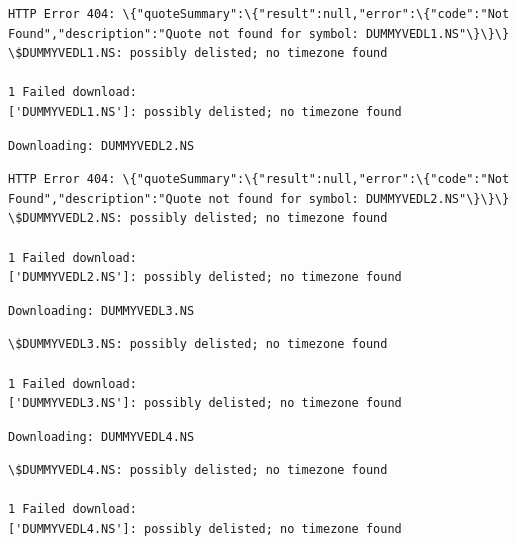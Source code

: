 \documentclass[11pt]{article}
\begin{document}
    \begin{Verbatim}[commandchars=\\\{\}]
HTTP Error 404: \{"quoteSummary":\{"result":null,"error":\{"code":"Not
Found","description":"Quote not found for symbol: DUMMYVEDL1.NS"\}\}\}
\$DUMMYVEDL1.NS: possibly delisted; no timezone found

1 Failed download:
['DUMMYVEDL1.NS']: possibly delisted; no timezone found
    \end{Verbatim}

    \begin{Verbatim}[commandchars=\\\{\}]
Downloading: DUMMYVEDL2.NS
    \end{Verbatim}

    \begin{Verbatim}[commandchars=\\\{\}]
HTTP Error 404: \{"quoteSummary":\{"result":null,"error":\{"code":"Not
Found","description":"Quote not found for symbol: DUMMYVEDL2.NS"\}\}\}
\$DUMMYVEDL2.NS: possibly delisted; no timezone found

1 Failed download:
['DUMMYVEDL2.NS']: possibly delisted; no timezone found
    \end{Verbatim}

    \begin{Verbatim}[commandchars=\\\{\}]
Downloading: DUMMYVEDL3.NS
    \end{Verbatim}

    \begin{Verbatim}[commandchars=\\\{\}]
\$DUMMYVEDL3.NS: possibly delisted; no timezone found

1 Failed download:
['DUMMYVEDL3.NS']: possibly delisted; no timezone found
    \end{Verbatim}

    \begin{Verbatim}[commandchars=\\\{\}]
Downloading: DUMMYVEDL4.NS
    \end{Verbatim}

    \begin{Verbatim}[commandchars=\\\{\}]
\$DUMMYVEDL4.NS: possibly delisted; no timezone found

1 Failed download:
['DUMMYVEDL4.NS']: possibly delisted; no timezone found
    \end{Verbatim}
\end{document}
